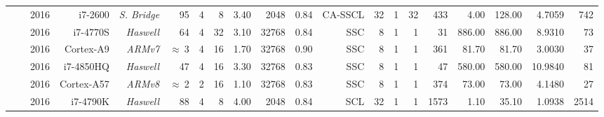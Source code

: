\begin{table}[htp]
\begin{adjustbox}{angle=90}
{{\begin{tabular}{|r|r r|r r r r r r|r r|r r r r|r r|r r r|}
                                                                 & \cite{Sarkis2016}    & 2016          & i7-2600            & \textit{S. Bridge} &          95  & {\color{Paired-1}4} &   8           & 3.40           &  2048    & 0.84     &   CA-SSCL          & 32            &                     1  & 32                &                     433  &                     4.00  &  128.00       &  4.7059        &    742             \\
                                                                 & \cite{Giard2016b}    & 2016          & i7-4770S           & \textit{Haswell}   &          64  & {\color{Paired-1}4} &  32           & 3.10           & 32768    & 0.84     &      SSC           &  8            &                     1  &  1                &                      31  &                   886.00  &  886.00       &  8.9310        &     73             \\
                                                                 & \cite{Giard2016b}    & 2016          & Cortex-A9          & \textit{ARMv7}     & $\approx~$3  & {\color{Paired-1}4} &  16           & 1.70           & 32768    & 0.90     &      SSC           &  8            &                     1  &  1                &                     361  &                    81.70  &   81.70       &  3.0030        &     37             \\
                                                                 & \cite{Cassagne2016b} & 2016          & i7-4850HQ          & \textit{Haswell}   &          47  & {\color{Paired-1}4} &  16           & 3.30           & 32768    & 0.83     &      SSC           &  8            &                     1  &  1                &                      47  &                   580.00  &  580.00       & 10.9840        &     81             \\
                                                                 & \cite{Cassagne2016b} & 2016          & Cortex-A57         & \textit{ARMv8}     & $\approx~$2  & {\color{Paired-1}2} &  16           & 1.10           & 32768    & 0.83     &      SSC           &  8            &                     1  &  1                &                     374  &                    73.00  &   73.00       &  4.1480        &     27             \\
                                                                 & \cite{Shen2016}      & 2016          & i7-4790K           & \textit{Haswell}   &          88  & {\color{Paired-1}4} &   8           & 4.00           &  2048    & 0.84     &       SCL          & 32            &                     1  &  1                &                    1573  &                     1.10  &   35.10       &  1.0938        &   2514             \\

\end{tabular}}}
\end{adjustbox}
\end{table}
